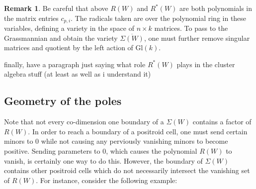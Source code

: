 \documentclass[11pt]{article}
\newtheorem{thm}{Theorem}[section]
\theoremstyle{remark}
\theoremstyle{definition}
\newtheorem{rmk}[thm]{Remark}
\begin{document}
\begin{rmk}
Be careful that above $R(W)$ and $R^{\ast}(W)$ are both polynomials in the matrix entries $c_{p,i}$. The radicals taken are over the polynomial ring in these variables, defining a variety in the space of $n \times k$ matrices. To pass to the Grassmannian and obtain the variety $\overline{\Sigma(W)}$, one must further remove singular matrices and quotient by the left action of $\mathrm{Gl}(k)$. 
\end{rmk}

{\color{red} finally, have a paragraph just saying what role $R^{\ast}(W)$ plays in the cluster algebra stuff (at least as well as i understand it)}


\subsection{Geometry of the poles}

Note that not every co-dimension one boundary of a $\Sigma(W)$ contains a factor of $R(W)$. In order to reach a boundary of a positroid cell, one must send certain minors to 0 while not causing any perviously vanishing minors to become positive. Sending parameters to $0$, which causes the polynomial $R(W)$ to vanish, is certainly one way to do this. However, the boundary of $\Sigma(W)$ contains other positroid cells which do not necessarily intersect the vanishing set of $R(W)$. For instance, consider the following example:
\end{document}
